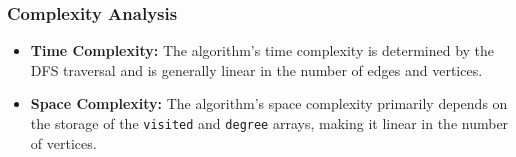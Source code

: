

\subsubsection{Complexity Analysis}

\begin{itemize}
    \item \textbf{Time Complexity:} The algorithm's time complexity is determined by the DFS traversal and is generally linear in the number of edges and vertices.
    
    \item \textbf{Space Complexity:} The algorithm's space complexity primarily depends on the storage of the \texttt{visited} and \texttt{degree} arrays, making it linear in the number of vertices.
\end{itemize}